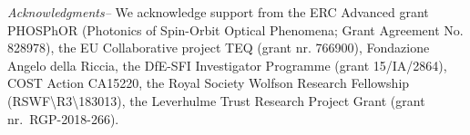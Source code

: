 \documentclass[
	aps, prl, superscriptaddress, twocolumn,
	10pt
	floatfix, 
    nofootinbib,
	tightenlines
]{revtex4-1}
\begin{document}

\begin{acknowledgments}
\textit{Acknowledgments--} We acknowledge support from the ERC Advanced grant PHOSPhOR (Photonics of Spin-Orbit Optical Phenomena; 
Grant Agreement No. 828978), the EU Collaborative project TEQ (grant nr. 766900), Fondazione Angelo della Riccia, the DfE-SFI Investigator Programme (grant 15/IA/2864), COST Action CA15220, the Royal Society Wolfson Research Fellowship (RSWF\textbackslash R3\textbackslash183013), the Leverhulme Trust Research Project Grant (grant nr.~RGP-2018-266).
\end{acknowledgments}

\end{document}
